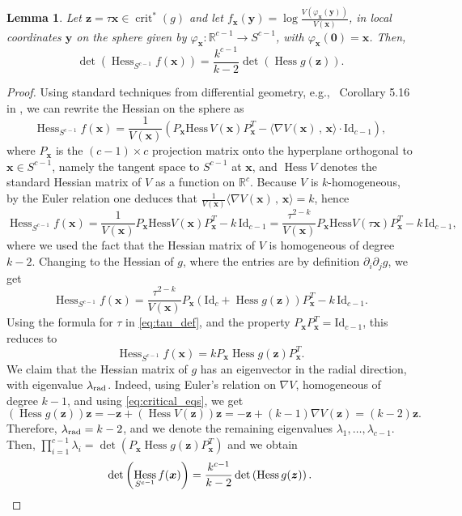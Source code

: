 \documentclass[a4paper,oneside]{amsart}
\newcommand{\bb}[1]{\boldsymbol{#1}}
\numberwithin{theorem}{section}
\newtheorem{lemma}[theorem]{Lemma}
\theoremstyle{remark}
\newcommand{\R}{\mathbb{R}}
\DeclareMathOperator{\crit}{crit}
\DeclareMathOperator{\Hess}{Hess}
\begin{document}
\begin{lemma}
  \label{lem:Hessian_transformation}
  Let $\bb{z} = \tau\bb{x}\in\crit^*(g)$ and let $f_{\bb x}(\bb y) = \log \frac{V(\varphi_{\bb x}(\bb{y}))}{V(\bb{x})}$, in local coordinates $\bb y$ on the sphere given by $\varphi_{\bb {x}}:\R^{c-1} \to S^{c-1}$, with $\varphi_{\bb {x}}(\bb 0) = \bb {x}$. Then,
  \[
  \det (\Hess_{S^{c-1}} f(\bb x)) = \frac{k^{c-1}}{k-2} \det (\Hess g ( \bb{z} )).
  \]
\end{lemma}

\begin{proof}
    Using standard techniques from differential geometry, e.g.,~ Corollary 5.16 in \cite{boumal2023introduction}, we can rewrite the Hessian on the sphere as
    \[
    \Hess_{S^{c-1}} f(\bb x) = \frac{1}{V(\bb{x})} \left( P_{\bb{x}}  \mathrm{Hess}\, V(\bb{x}) P_{\bb{x}}^T - \langle \nabla V(\bb{x})\, ,\, \bb{x} \rangle \cdot \mathrm{Id}_{c-1}\right),
    \]
    where $P_{\bb{x}}$ is the $(c-1)\times c$ projection matrix onto the hyperplane orthogonal to $\bb{x}\in S^{c-1}$, namely the tangent space to $S^{c-1}$ at $\bb{x}$, and $\Hess V$ denotes the standard Hessian matrix of $V$ as a function on $\R^c$.
    Because $V$ is $k$-homogeneous, by the Euler relation one deduces that $\frac{1}{V(\bb{x})} \langle \nabla V(\bb{x})\, ,\, \bb{x} \rangle = k$, hence 
    \[
   \Hess_{S^{c-1}} f(\bb x) = \frac{1}{V(\bb{x})} P_{\bb{x}}  \mathrm{Hess} V(\bb{x}) P_{\bb{x}}^T - k\, \mathrm{Id}_{c-1} = \frac{\tau^{2-k}}{V(\bb{x})} P_{\bb{x}} \mathrm{Hess} V(\tau \bb{x}) P_{\bb{x}}^T - k\, \mathrm{Id}_{c-1},
    \]
    where we used the fact that the Hessian matrix of $V$ is homogeneous of degree $k-2$. 
    Changing to the Hessian of $g$, where the entries are by definition $\partial_i\partial_j g$, we get 
    \[
    \Hess_{S^{c-1}} f(\bb x) = \frac{\tau^{2-k}}{V(\bb{x})} P_{\bb{x}} \left( \mathrm{Id}_{c} +  \Hess g(\bb{z}) \right) P_{\bb{x}}^T - k\, \mathrm{Id}_{c-1}.
    \]
    Using the formula for $\tau$ in \eqref{eq:tau_def}, and the property $P_{\bb{x}}P_{\bb{x}}^T = \mathrm{Id}_{c-1}$, this reduces to 
    \[
    \Hess_{S^{c-1}} f(\bb x) = k P_{\bb{x}}  \Hess g(\bb{z}) P_{\bb{x}}^T.
    \]
    We claim that the Hessian matrix of $g$ has an eigenvector in the radial direction, with eigenvalue $\lambda_{\rm rad}$. Indeed, using Euler's relation on $\nabla V$, homogeneous of degree $k-1$, and using \eqref{eq:critical_eqs}, we get
    \[
    \left(\Hess g(\bb{z})\right) \bb{z} = -\bb{z} + \left(\Hess V(\bb{z})\right) \bb{z} = -\bb{z} + (k-1)\nabla V(\bb{z}) = (k-2) \bb{z}.
    \]
    Therefore, $\lambda_{\rm rad} = k-2$, and we denote the remaining eigenvalues $\lambda_1,\ldots,\lambda_{c-1}$. Then, $\prod_{i=1}^{c-1} \lambda_i = \det \left( P_{\bb{x}}  \Hess g(\bb{z}) P_{\bb{x}}^T \right)$ and we obtain
    \[
    \det \left( \Hess_{S^{c-1}} f(\bb x)\right) = \frac{k^{c-1}}{k-2} \det \left(\Hess g(\bb{z})\right) . \qedhere
    \]
\end{proof}
\end{document}
